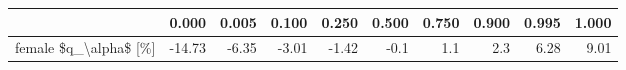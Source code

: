 \begin{tabular}{lrrrrrrrrr}
\toprule
{} &  0.000 &  0.005 &  0.100 &  0.250 &  0.500 &  0.750 &  0.900 &  0.995 &  1.000 \\
\midrule
female \$q\_\textbackslash alpha\$ [\%] & -14.73 &  -6.35 &  -3.01 &  -1.42 &   -0.1 &    1.1 &    2.3 &   6.28 &   9.01 \\
\bottomrule
\end{tabular}
